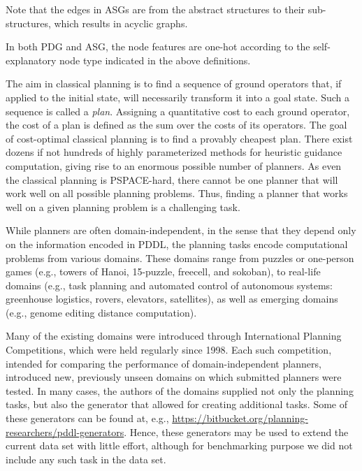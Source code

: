 \documentclass{article}
\begin{document}
Note that the edges in ASGs are from the abstract structures to their sub-structures, which results in acyclic graphs.

In both PDG and ASG, the node features are one-hot according to the self-explanatory node type indicated in the above definitions.

The aim in classical planning is to find a sequence of ground operators that, if
applied to the initial state, will necessarily transform it into a goal state.
Such a sequence is called a \emph{plan}. Assigning a quantitative cost to each
ground operator, the cost of a plan is defined as the sum over the costs of its
operators. The goal of cost-optimal classical planning is to find a provably
cheapest plan.
There exist dozens if not hundreds of highly parameterized methods
for heuristic guidance computation, giving rise to an enormous possible number
of planners. As even the classical planning is PSPACE-hard, there cannot be one
planner that will work well on all possible planning problems. Thus, finding a
planner that works well on a given planning problem is a challenging task.

While planners are often domain-independent, in the sense that they depend only
on the information encoded in PDDL, the planning tasks encode computational
problems from various domains. These domains range from puzzles or one-person
games (e.g., towers of Hanoi, 15-puzzle, freecell, and sokoban), to real-life
domains (e.g., task planning and automated control of autonomous systems:
greenhouse logistics, rovers, elevators, satellites), as well as emerging domains (e.g.,
genome editing distance computation). 

Many of the existing domains were introduced through International Planning
Competitions, which were held  regularly since 1998. Each such
competition, intended for comparing the performance of domain-independent
planners, introduced new, previously unseen domains on which submitted planners were
tested. In many cases, the authors of the domains supplied not only the
planning tasks, but also the generator that allowed for creating additional
tasks. Some of these generators can be found at, e.g.,
\url{https://bitbucket.org/planning-researchers/pddl-generators}.
Hence, these generators may be used to extend the current data set with little effort, although for benchmarking purpose we did not include any such task in the data set.
\end{document}
